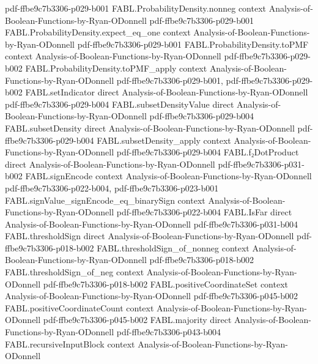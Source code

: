 \begin{theorem}
  {pdf-ffbe9c7b3306-p029-b001}
\proofstep
  {FABL.ProbabilityDensity.nonneg}
  {context}
  {Analysis-of-Boolean-Functions-by-Ryan-ODonnell}
  {pdf-ffbe9c7b3306-p029-b001}
\proofstep
  {FABL.ProbabilityDensity.expect_eq_one}
  {context}
  {Analysis-of-Boolean-Functions-by-Ryan-ODonnell}
  {pdf-ffbe9c7b3306-p029-b001}
\proofstep
  {FABL.ProbabilityDensity.toPMF}
  {context}
  {Analysis-of-Boolean-Functions-by-Ryan-ODonnell}
  {pdf-ffbe9c7b3306-p029-b002}
\proofstep
  {FABL.ProbabilityDensity.toPMF_apply}
  {context}
  {Analysis-of-Boolean-Functions-by-Ryan-ODonnell}
  {pdf-ffbe9c7b3306-p029-b001,
    pdf-ffbe9c7b3306-p029-b002}
\proofstep
  {FABL.setIndicator}
  {direct}
  {Analysis-of-Boolean-Functions-by-Ryan-ODonnell}
  {pdf-ffbe9c7b3306-p029-b004}
\proofstep
  {FABL.subsetDensityValue}
  {direct}
  {Analysis-of-Boolean-Functions-by-Ryan-ODonnell}
  {pdf-ffbe9c7b3306-p029-b004}
\proofstep
  {FABL.subsetDensity}
  {direct}
  {Analysis-of-Boolean-Functions-by-Ryan-ODonnell}
  {pdf-ffbe9c7b3306-p029-b004}
\proofstep
  {FABL.subsetDensity_apply}
  {context}
  {Analysis-of-Boolean-Functions-by-Ryan-ODonnell}
  {pdf-ffbe9c7b3306-p029-b004}
\proofstep
  {FABL.f₂DotProduct}
  {direct}
  {Analysis-of-Boolean-Functions-by-Ryan-ODonnell}
  {pdf-ffbe9c7b3306-p031-b002}
\proofstep
  {FABL.signEncode}
  {context}
  {Analysis-of-Boolean-Functions-by-Ryan-ODonnell}
  {pdf-ffbe9c7b3306-p022-b004,
    pdf-ffbe9c7b3306-p023-b001}
\proofstep
  {FABL.signValue_signEncode_eq_binarySign}
  {context}
  {Analysis-of-Boolean-Functions-by-Ryan-ODonnell}
  {pdf-ffbe9c7b3306-p022-b004}
\proofstep
  {FABL.IsFar}
  {direct}
  {Analysis-of-Boolean-Functions-by-Ryan-ODonnell}
  {pdf-ffbe9c7b3306-p031-b004}
\proofstep
  {FABL.thresholdSign}
  {direct}
  {Analysis-of-Boolean-Functions-by-Ryan-ODonnell}
  {pdf-ffbe9c7b3306-p018-b002}
\proofstep
  {FABL.thresholdSign_of_nonneg}
  {context}
  {Analysis-of-Boolean-Functions-by-Ryan-ODonnell}
  {pdf-ffbe9c7b3306-p018-b002}
\proofstep
  {FABL.thresholdSign_of_neg}
  {context}
  {Analysis-of-Boolean-Functions-by-Ryan-ODonnell}
  {pdf-ffbe9c7b3306-p018-b002}
\proofstep
  {FABL.positiveCoordinateSet}
  {context}
  {Analysis-of-Boolean-Functions-by-Ryan-ODonnell}
  {pdf-ffbe9c7b3306-p045-b002}
\proofstep
  {FABL.positiveCoordinateCount}
  {context}
  {Analysis-of-Boolean-Functions-by-Ryan-ODonnell}
  {pdf-ffbe9c7b3306-p045-b002}
\proofstep
  {FABL.majority}
  {direct}
  {Analysis-of-Boolean-Functions-by-Ryan-ODonnell}
  {pdf-ffbe9c7b3306-p043-b004}
\proofstep
  {FABL.recursiveInputBlock}
  {context}
  {Analysis-of-Boolean-Functions-by-Ryan-ODonnell}

\end{theorem}
